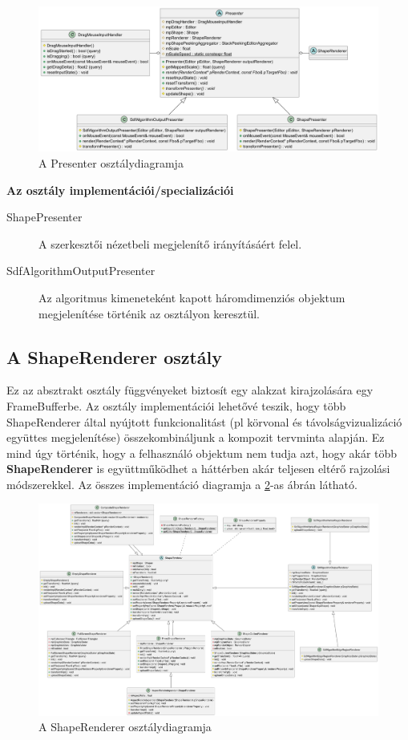 \begin{figure}[H]
    \centering
    \includegraphics[width=1\linewidth]{images/class_presenter.png}
    \caption{A Presenter osztálydiagramja}
    \label{fig:class_presenter-1}
\end{figure}

\textbf{Az osztály implementációi/specializációi}

\begin{description}
    \item[ShapePresenter] A szerkesztői nézetbeli megjelenítő irányításáért felel.
    \item[SdfAlgorithmOutputPresenter] Az algoritmus kimeneteként kapott háromdimenziós objektum megjelenítése történik az osztályon keresztül.
\end{description}

\subsection{A ShapeRenderer osztály}

Ez az absztrakt osztály függvényeket biztosít egy alakzat kirajzolására egy FrameBufferbe. Az osztály implementációi lehetővé teszik, hogy több ShapeRenderer által nyújtott funkcionalitást (pl körvonal és távolságvizualizáció együttes megjelenítése) összekombináljunk a kompozit tervminta alapján. Ez mind úgy történik, hogy a felhasználó objektum nem tudja azt, hogy akár több \textbf{ShapeRenderer} is együttműködhet a háttérben akár teljesen eltérő rajzolási módszerekkel. Az összes implementáció diagramja a \ref{fig:class_shape_renderer-1}-as ábrán látható.

\begin{figure}[H]
    \centering
    \includegraphics[width=1\linewidth]{images/class_shape_renderer.png}
    \caption{A ShapeRenderer osztálydiagramja}
    \label{fig:class_shape_renderer-1}
\end{figure}


